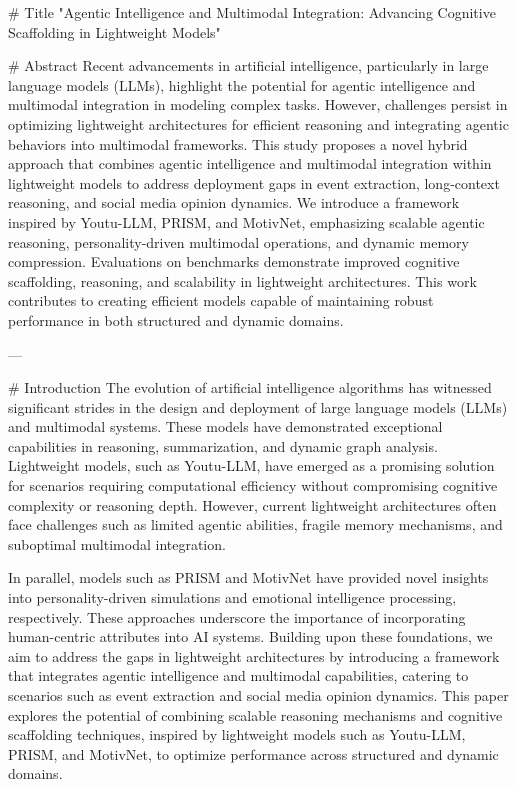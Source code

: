 # Title  
"Agentic Intelligence and Multimodal Integration: Advancing Cognitive Scaffolding in Lightweight Models"

# Abstract  
Recent advancements in artificial intelligence, particularly in large language models (LLMs), highlight the potential for agentic intelligence and multimodal integration in modeling complex tasks. However, challenges persist in optimizing lightweight architectures for efficient reasoning and integrating agentic behaviors into multimodal frameworks. This study proposes a novel hybrid approach that combines agentic intelligence and multimodal integration within lightweight models to address deployment gaps in event extraction, long-context reasoning, and social media opinion dynamics. We introduce a framework inspired by Youtu-LLM, PRISM, and MotivNet, emphasizing scalable agentic reasoning, personality-driven multimodal operations, and dynamic memory compression. Evaluations on benchmarks demonstrate improved cognitive scaffolding, reasoning, and scalability in lightweight architectures. This work contributes to creating efficient models capable of maintaining robust performance in both structured and dynamic domains.

---

# Introduction  
The evolution of artificial intelligence algorithms has witnessed significant strides in the design and deployment of large language models (LLMs) and multimodal systems. These models have demonstrated exceptional capabilities in reasoning, summarization, and dynamic graph analysis. Lightweight models, such as Youtu-LLM, have emerged as a promising solution for scenarios requiring computational efficiency without compromising cognitive complexity or reasoning depth. However, current lightweight architectures often face challenges such as limited agentic abilities, fragile memory mechanisms, and suboptimal multimodal integration.

In parallel, models such as PRISM and MotivNet have provided novel insights into personality-driven simulations and emotional intelligence processing, respectively. These approaches underscore the importance of incorporating human-centric attributes into AI systems. Building upon these foundations, we aim to address the gaps in lightweight architectures by introducing a framework that integrates agentic intelligence and multimodal capabilities, catering to scenarios such as event extraction and social media opinion dynamics. This paper explores the potential of combining scalable reasoning mechanisms and cognitive scaffolding techniques, inspired by lightweight models such as Youtu-LLM, PRISM, and MotivNet, to optimize performance across structured and dynamic domains.

